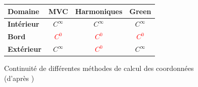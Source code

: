 \begin{figure}[ht]
  \begin{center}
    \begin{tabular}{|l|c|c|c|}
      \hline
      \textbf{Domaine} & MVC & Harmoniques & Green\\
      \hline
      \textbf{Intérieur} & \textcolor{OliveGreen}{$C^\infty$} 
      & \textcolor{OliveGreen}{$C^\infty$} 
      & \textcolor{OliveGreen}{$C^\infty$} \\
      \hline
      \textbf{Bord} & \textcolor{Red}{$C^0$} 
      & \textcolor{Red}{$C^0$} 
      & \textcolor{Red}{$C^0$} \\
      \hline
      \textbf{Extérieur} & \textcolor{OliveGreen}{$C^\infty$} 
      & \textcolor{Red}{$C^0$}
      & \textcolor{OliveGreen}{$C^\infty$} \\
      \hline
    \end{tabular}
    \caption{Continuité de différentes méthodes de calcul des
      coordonnées (d'après \cite{GPCP13})}
    \label{SURcoo}
  \end{center}
\end{figure}